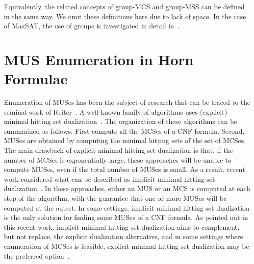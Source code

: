 \documentclass{llncs}
\begin{document}
Equivalently, the related concepts of group-MCS and group-MSS can be
defined in the same way. We omit these definitions here due to lack of
space. In the case of MaxSAT, the use of groups is investigated in
detail in~\cite{hmms-aicomm15}.

 
\section{MUS Enumeration in Horn Formulae} \label{sec:hmusenum}

Enumeration of MUSes has been the subject of research that can be
traced to the seminal work of Reiter~\cite{reiter-aij87}.
A well-known family of algorithms uses (explicit) minimal hitting set
dualization~\cite{lozinskii-jetai03,stuckey-padl05,liffiton-jar08}. The
organization of these algorithms can be summarized as follows. First
compute all the MCSes of a CNF formula. Second, MUSes are obtained by
computing the minimal hitting sets of the set of MCSes.
The main drawback of explicit minimal hitting set dualization is that,
if the number of MCSes is exponentially large, these approaches will
be unable to compute MUSes, even if the total number of MUSes is
small.
As a result, recent work considered what can be described as implicit
minimal hitting set
dualization~\cite{liffiton-cpaior13,pms-aaai13,lpmms-cj15}. In these
approaches, either an MUS or an MCS is computed at each step of the
algorithm, with the guarantee that one or more MUSes will be computed
at the outset. In some settings, implicit minimal hitting set
dualization is the only solution for finding some MUSes of a CNF
formula.
As pointed out in this recent work, implicit minimal hitting set
dualization aims to complement, but not replace, the explicit
dualization alternative, and in some settings where enumeration of
MCSes is feasible, explicit minimal hitting set dualization may be the
preferred option~\cite{pms-aaai13,lpmms-cj15}.
\end{document}
